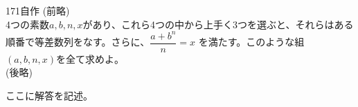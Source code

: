\begin{prob}{171}{}{自作}
 (前略) \\
 4つの素数$a, b, n, x$があり、これら4つの中から上手く3つを選ぶと、それらはある順番で等差数列をなす。さらに、$\dfrac{a+b^n}{n}=x$ を満たす。このような組$(a, b, n, x)$を全て求めよ。 \\
 (後略)
\end{prob}
ここに解答を記述。